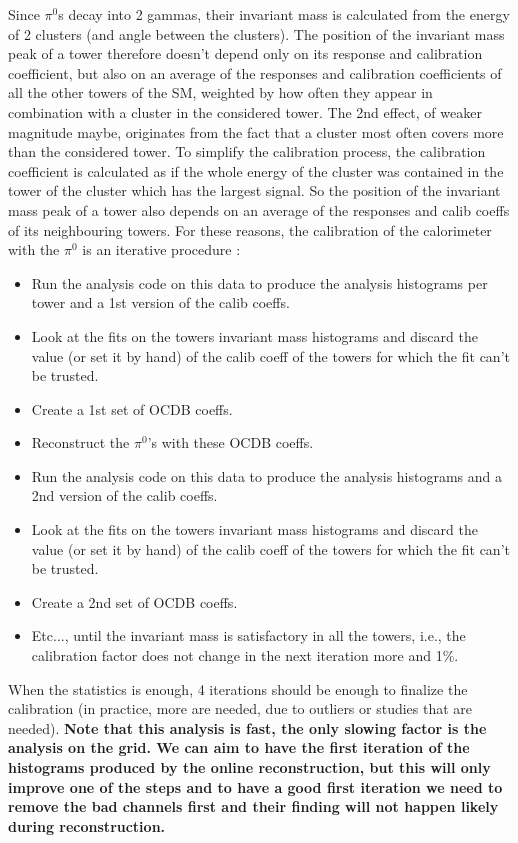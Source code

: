 Since $\pi^{0}$s decay into 2 gammas, their invariant mass is calculated from the energy of 2 clusters (and angle between the clusters). The position of the invariant mass peak of a tower therefore doesn't depend only on its response and calibration coefficient, but also on an average of the responses and calibration coefficients of all the other towers of the SM, weighted by  how often they appear in combination with a cluster in the considered tower. The 2nd effect, of weaker magnitude maybe, originates from the fact that a cluster most often covers more than the considered tower. To simplify the calibration process, the calibration coefficient is calculated as if the whole energy of the cluster was contained in the tower of the cluster which has the largest signal. So the position of the invariant mass peak of a tower also depends on an average of the responses and calib coeffs of its neighbouring towers. For these reasons, the calibration of the calorimeter with the  $\pi^{0}$ is an iterative procedure :
\begin{itemize}
\item Run the analysis code on this data to produce the analysis histograms per tower and a 1st version of the calib coeffs.
\item Look at the fits on the towers invariant mass histograms and discard the value (or set it by hand) of the calib coeff of the towers for which the fit can't be trusted.
\item Create a 1st set of OCDB coeffs.
\item Reconstruct the $\pi^{0}$'s with these OCDB coeffs.
\item Run the analysis code on this data to produce the analysis histograms and a 2nd version of the calib coeffs.
\item Look at the fits on the towers invariant mass histograms and discard the value (or set it by hand) of the calib coeff of the towers for which the fit can't be trusted.
\item Create a 2nd set of OCDB coeffs.
\item Etc..., until the invariant mass is satisfactory in all the towers, i.e., the calibration factor does not change in the next iteration more and 1\%.
\end{itemize}
When the statistics is enough, 4 iterations should be enough to finalize the calibration (in practice, more are needed, due to outliers or studies that are needed).
\bf{Note that this analysis is fast, the only slowing factor is the analysis on the grid}. {We can aim to have the first iteration of the histograms produced by the online reconstruction, but this will only improve one of the steps and to have a good first iteration we need to remove the bad channels first and their finding will not happen likely during reconstruction. }

